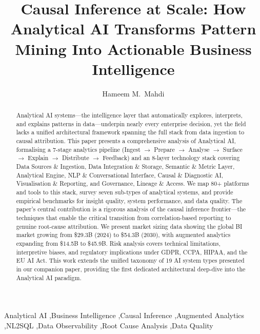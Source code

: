 \documentclass[preprint,12pt,authoryear]{elsarticle}
\theoremstyle{definition}
\begin{document}
\begin{frontmatter}

\title{Causal Inference at Scale: How Analytical AI Transforms Pattern Mining Into Actionable Business Intelligence}

\author[mayo]{Hameem M.~Mahdi}

\address[mayo]{Mayo Clinic, Rochester, MN 55905, USA}

\begin{abstract}
Analytical AI systems---the intelligence layer that automatically explores, interprets, and explains patterns in data---underpin nearly every enterprise decision, yet the field lacks a unified architectural framework spanning the full stack from data ingestion to causal attribution. This paper presents a comprehensive analysis of Analytical AI, formalising a 7-stage analytics pipeline (Ingest $\rightarrow$ Prepare $\rightarrow$ Analyse $\rightarrow$ Surface $\rightarrow$ Explain $\rightarrow$ Distribute $\rightarrow$ Feedback) and an 8-layer technology stack covering Data Sources \& Ingestion, Data Integration \& Storage, Semantic \& Metric Layer, Analytical Engine, NLP \& Conversational Interface, Causal \& Diagnostic AI, Visualisation \& Reporting, and Governance, Lineage \& Access. We map 80+ platforms and tools to this stack, survey seven sub-types of analytical systems, and provide empirical benchmarks for insight quality, system performance, and data quality. The paper's central contribution is a rigorous analysis of the causal inference frontier---the techniques that enable the critical transition from correlation-based reporting to genuine root-cause attribution. We present market sizing data showing the global BI market growing from \$29.3B (2024) to \$54.3B (2030), with augmented analytics expanding from \$14.5B to \$45.9B. Risk analysis covers technical limitations, interpretive biases, and regulatory implications under GDPR, CCPA, HIPAA, and the EU AI Act. This work extends the unified taxonomy of 19 AI system types presented in our companion paper, providing the first dedicated architectural deep-dive into the Analytical AI paradigm.
\end{abstract}

\begin{keyword}
Analytical AI \sep Business Intelligence \sep Causal Inference \sep Augmented Analytics \sep NL2SQL \sep Data Observability \sep Root Cause Analysis \sep Data Quality
\end{keyword}

\end{frontmatter}
\end{document}

